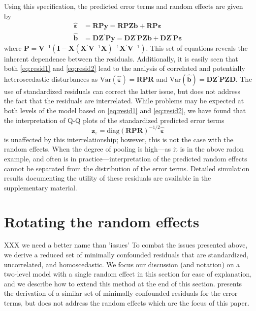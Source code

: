 \documentclass[12pt]{article} %
\newcommand{\hh}[1]{{\color{orange} #1}}
\newcommand{\al}[1]{{\color{red} #1}}
\newcommand{\inv}{\ensuremath{^{-1}}}
\newcommand{\trans}{\ensuremath{^\prime}}
\newcommand{\var}{\ensuremath{\mathrm{Var}}}
\begin{document}
Using this specification, the predicted error terms and random effects are given by 
%
\begin{align}
\widehat{\bm{\varepsilon}} &= \bm{RPy} = \bm{RPZb} + \bm{RP \varepsilon} \label{eq:resid1}\\
\widehat{\bm{b}} &= \bm{DZ}\trans \bm{Py} = \bm{DZ}\trans \bm{PZb} + \bm{DZ}\trans \bm{P \varepsilon} \label{eq:resid2}
\end{align}
%
where $\bm{P} = \bm{V}\inv( \bm{I} - \bm{X} (\bm{X}\trans \bm{V}\inv \bm{X})\inv \bm{X}\trans \bm{V}\inv)$. This  set of equations %
reveals the inherent dependence between the residuals.
Additionally, it is easily seen that both \eqref{eq:resid1} and \eqref{eq:resid2} lead to the analysis of correlated and potentially heteroscedastic disturbances as $\var(\widehat{\bm{\varepsilon}}) = \bm{RPR}$ and $\var(\widehat{\bm{b}}) = \bm{DZ}\trans \bm{PZD}$.
\al{
The use of standardized residuals can correct the latter issue, but does not address the fact that the residuals are interrelated. While problems may be expected at both levels of the model based on \eqref{eq:resid1} and \eqref{eq:resid2}, we have found that the interpretation of Q-Q plots of the standardized predicted error terms
%
\[
\bm{z}_{\varepsilon} =  \text{diag} \left(\bm{RPR} \right)^{-1/2} \widehat{\bm{\varepsilon}}
\]
%
is unaffected by this interrelationship; however, this is not the case with the random effects.  When the degree of pooling is high---as it is in the above radon example, and often is in practice---interpretation of the predicted random effects cannot be separated from the distribution of the error terms. Detailed simulation results \hh{documenting} the utility of  these residuals are available in the supplementary material.
}


\section{Rotating the random effects}\label{sec:rotate}
\hh{XXX we need a better name than 'issues'}
To combat the issues presented above, we derive a reduced set of minimally confounded residuals that are standardized, uncorrelated, and homoscedastic. \al{We focus our discussion (and notation) on a two-level model with a single random effect in this section for ease of explanation, and we describe how to extend this method at the end of this section.} \cite{HildenMinton:1995wh} presents the derivation of a similar set of minimally confounded residuals for the error terms, but does not address the random effects which are the focus of this paper. 
\end{document}
